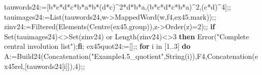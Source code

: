 \documentclass[
  10pt,
  letterpaper,
]{article}
\newenvironment{Shaded}{}{}
\newcommand{\BuiltInTok}[1]{\textcolor[rgb]{0.00,0.50,0.00}{#1}}
\newcommand{\ConstantTok}[1]{\textcolor[rgb]{0.53,0.00,0.00}{#1}}
\newcommand{\ControlFlowTok}[1]{\textcolor[rgb]{0.00,0.44,0.13}{\textbf{#1}}}
\newcommand{\ExtensionTok}[1]{#1}
\newcommand{\FloatTok}[1]{\textcolor[rgb]{0.25,0.63,0.44}{#1}}
\newcommand{\NormalTok}[1]{#1}
\newcommand{\OperatorTok}[1]{\textcolor[rgb]{0.40,0.40,0.40}{#1}}
\newcommand{\StringTok}[1]{\textcolor[rgb]{0.25,0.44,0.63}{#1}}
\newcommand{\VariableTok}[1]{\textcolor[rgb]{0.10,0.09,0.49}{#1}}
\begin{document}
\begin{Shaded}
\begin{Highlighting}[]
\VariableTok{tauwords24}\OperatorTok{:=}\NormalTok{[}\VariableTok{b}\OperatorTok{*}\VariableTok{c}\OperatorTok{*}\VariableTok{d}\OperatorTok{*}\VariableTok{c}\OperatorTok{*}\VariableTok{b}\OperatorTok{*}\VariableTok{a}\OperatorTok{*}\VariableTok{b}\OperatorTok{*}\NormalTok{(}\VariableTok{d}\OperatorTok{*}\VariableTok{c}\NormalTok{)}\OperatorTok{\^{}}\FloatTok{2}\OperatorTok{*}\VariableTok{d}\OperatorTok{*}\VariableTok{b}\OperatorTok{*}\VariableTok{a}\OperatorTok{,}\NormalTok{(}\VariableTok{b}\OperatorTok{*}\VariableTok{c}\OperatorTok{*}\VariableTok{d}\OperatorTok{*}\VariableTok{c}\OperatorTok{*}\VariableTok{b}\OperatorTok{*}\VariableTok{a}\NormalTok{)}\OperatorTok{\^{}}\FloatTok{2}\OperatorTok{,}\NormalTok{(}\VariableTok{c}\OperatorTok{*}\VariableTok{d}\NormalTok{)}\OperatorTok{\^{}}\FloatTok{4}\NormalTok{]}\OperatorTok{;;}
\VariableTok{tauimages24}\OperatorTok{:=}\BuiltInTok{List}\NormalTok{(}\VariableTok{tauwords24}\OperatorTok{,}\VariableTok{w}\OperatorTok{{-}\textgreater{}}\BuiltInTok{MappedWord}\NormalTok{(}\VariableTok{w}\OperatorTok{,}\VariableTok{f4}\OperatorTok{,}\VariableTok{ex45}\NormalTok{.}\VariableTok{mark}\NormalTok{))}\OperatorTok{;;}
\VariableTok{zinv24}\OperatorTok{:=}\BuiltInTok{Filtered}\NormalTok{(}\BuiltInTok{Elements}\NormalTok{(}\BuiltInTok{Centre}\NormalTok{(}\VariableTok{ex45}\NormalTok{.}\VariableTok{group}\NormalTok{))}\OperatorTok{,}\VariableTok{z}\OperatorTok{{-}\textgreater{}}\BuiltInTok{Order}\NormalTok{(}\VariableTok{z}\NormalTok{)}\OperatorTok{=}\FloatTok{2}\NormalTok{)}\OperatorTok{;;}
\ControlFlowTok{if} \BuiltInTok{Set}\NormalTok{(}\VariableTok{tauimages24}\NormalTok{)}\OperatorTok{\textless{}\textgreater{}}\BuiltInTok{Set}\NormalTok{(}\VariableTok{zinv24}\NormalTok{) }\ConstantTok{or} \BuiltInTok{Length}\NormalTok{(}\VariableTok{zinv24}\NormalTok{)}\OperatorTok{\textless{}\textgreater{}}\FloatTok{3} \ControlFlowTok{then} \BuiltInTok{Error}\NormalTok{(}\StringTok{"Complete central involution list"}\NormalTok{)}\OperatorTok{;}\ControlFlowTok{fi}\OperatorTok{;}
\VariableTok{ex45quot24}\OperatorTok{:=}\NormalTok{[]}\OperatorTok{;;}
\ControlFlowTok{for} \VariableTok{i} \ExtensionTok{in}\NormalTok{ [}\FloatTok{1}\OperatorTok{..}\FloatTok{3}\NormalTok{] }\ControlFlowTok{do}
 \VariableTok{A}\OperatorTok{:=}\VariableTok{Build24}\NormalTok{(}\BuiltInTok{Concatenation}\NormalTok{(}\StringTok{"Example4.5\_quotient"}\OperatorTok{,}\BuiltInTok{String}\NormalTok{(}\VariableTok{i}\NormalTok{))}\OperatorTok{,}\VariableTok{F4}\OperatorTok{,}\BuiltInTok{Concatenation}\NormalTok{(}\VariableTok{ex45rel}\OperatorTok{,}\NormalTok{[}\VariableTok{tauwords24}\NormalTok{[}\VariableTok{i}\NormalTok{]])}\OperatorTok{,}\FloatTok{4}\NormalTok{)}\OperatorTok{;;}

\end{Highlighting}
\end{Shaded}
\end{document}
